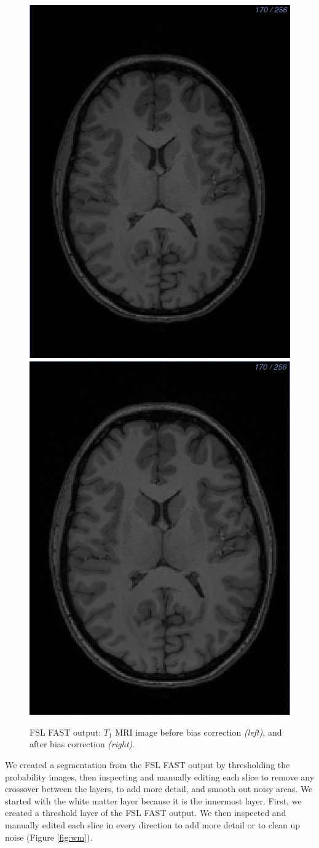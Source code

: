 \begin{figure}[H]
\begin{center}
\includegraphics[width=.45\textwidth]{Figures/Original_T1}
\includegraphics[width=.45\textwidth]{Figures/T1_corrected}
\caption{FSL FAST output: $T_1$ MRI image before bias correction \textit{(left)}, and after bias correction \textit{(right)}.}
\label{fig:fastoutbias}
\end{center}
\end{figure}


We created a segmentation from the FSL FAST output by thresholding the probability images, then inspecting and manually editing each slice to remove any crossover between the layers, to add more detail, and smooth out noisy areas. We started with the white matter layer because it is the innermost layer. First, we created a threshold layer of the FSL FAST output. We then inspected and manually edited each slice in every direction to add more detail or to clean up noise (Figure \ref{fig:wm}).

